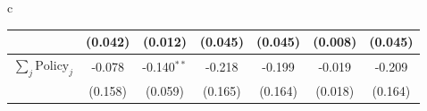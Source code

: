 \documentclass{beamer}
\def\bcolor{\color{green}}
\def\pcolor{\color{blue}}
\renewcommand{\to}{{\rightarrow}}
\begin{document}
\begin{frame}
\begin{table}
\begin{minipage}{\linewidth}
\begin{tabular}{c}
\begin{tabular}{lccc|c|cc}
 & (0.042) & (0.012) & (0.045) & (0.045) & (0.008) & (0.045)\\
 \midrule
$\sum_j \mathrm{Policy}_j$ & -0.078 & -0.140$^{**}$ & -0.218 & -0.199 & -0.019 & -0.209\\
 & (0.158) & (0.059) & (0.165) & (0.164) & (0.018) & (0.164)\\
\bottomrule
\end{tabular}

    \\
  \end{tabular}
  \end{minipage}
\end{table}
\end{frame}
\end{document}
